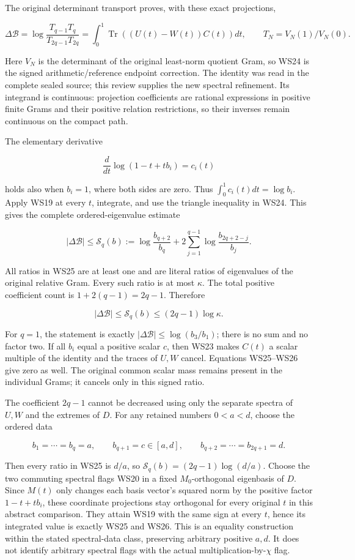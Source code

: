 \documentclass{article}
\begin{document}
The original determinant transport proves, with these exact projections,

\[
\Delta\mathcal B
=\log\frac{T_{q-1}T_q}{T_{2q-1}T_{2q}}
=\int_0^1\operatorname{Tr}((U(t)-W(t))C(t))dt,
\qquad T_N=V_N(1)/V_N(0).
\tag{WS24}
\]

Here \(V_N\) is the determinant of the original least-norm quotient Gram, so WS24 is the signed arithmetic/reference endpoint correction. The identity was read in the complete sealed source; this review supplies the new spectral refinement. Its integrand is continuous: projection coefficients are rational expressions in positive finite Grams and their positive relation restrictions, so their inverses remain continuous on the compact path.

The elementary derivative

\[
\frac{d}{dt}\log(1-t+tb_i)=c_i(t)
\]

holds also when \(b_i=1\), where both sides are zero. Thus \(\int_0^1c_i(t)dt=\log b_i\). Apply WS19 at every \(t\), integrate, and use the triangle inequality in WS24. This gives the complete ordered-eigenvalue estimate

\[
\boxed{
|\Delta\mathcal B|
\le\mathscr S_q(b)
:=\log\frac{b_{q+2}}{b_q}
 +2\sum_{j=1}^{q-1}\log\frac{b_{2q+2-j}}{b_j}.
}
\tag{WS25}
\]

All ratios in WS25 are at least one and are literal ratios of eigenvalues of the original relative Gram. Every such ratio is at most \(\kappa\). The total positive coefficient count is \(1+2(q-1)=2q-1\). Therefore

\[
\boxed{\quad |\Delta\mathcal B|
\le\mathscr S_q(b)\le(2q-1)\log\kappa.\quad}
\tag{WS26}
\]

For \(q=1\), the statement is exactly \(|\Delta\mathcal B|\le\log(b_3/b_1)\); there is no sum and no factor two. If all \(b_i\) equal a positive scalar \(c\), then WS23 makes \(C(t)\) a scalar multiple of the identity and the traces of \(U,W\) cancel. Equations WS25--WS26 give zero as well. The original common scalar mass remains present in the individual Grams; it cancels only in this signed ratio.

The coefficient \(2q-1\) cannot be decreased using only the separate spectra of \(U,W\) and the extremes of \(D\). For any retained numbers \(0<a<d\), choose the ordered data

\[
b_1=\cdots=b_q=a,
\qquad b_{q+1}=c\in[a,d],
\qquad b_{q+2}=\cdots=b_{2q+1}=d.
\tag{WS27}
\]

Then every ratio in WS25 is \(d/a\), so \(\mathscr S_q(b)=(2q-1)\log(d/a)\). Choose the two commuting spectral flags WS20 in a fixed \(M_0\)-orthogonal eigenbasis of \(D\). Since \(M(t)\) only changes each basis vector's squared norm by the positive factor \(1-t+tb_i\), these coordinate projections stay orthogonal for every original \(t\) in this abstract comparison. They attain WS19 with the same sign at every \(t\), hence its integrated value is exactly WS25 and WS26. This is an equality construction within the stated spectral-data class, preserving arbitrary positive \(a,d\). It does not identify arbitrary spectral flags with the actual multiplication-by-\(\chi\) flag.
\end{document}
